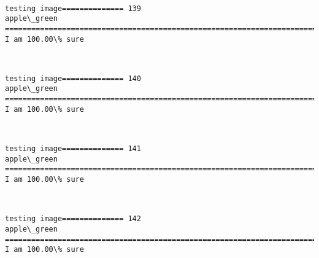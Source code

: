 \documentclass[11pt]{article}
\begin{document}
    \begin{center}
    \end{center}
    { \hspace*{\fill} \\}
    
    \begin{Verbatim}[commandchars=\\\{\}]
testing image============== 139
apple\_green
============================================================================
I am 100.00\% sure

    \end{Verbatim}

    \begin{center}
    \end{center}
    { \hspace*{\fill} \\}
    
    \begin{Verbatim}[commandchars=\\\{\}]
testing image============== 140
apple\_green
============================================================================
I am 100.00\% sure

    \end{Verbatim}

    \begin{center}
    \end{center}
    { \hspace*{\fill} \\}
    
    \begin{Verbatim}[commandchars=\\\{\}]
testing image============== 141
apple\_green
============================================================================
I am 100.00\% sure

    \end{Verbatim}

    \begin{center}
    \end{center}
    { \hspace*{\fill} \\}
    
    \begin{Verbatim}[commandchars=\\\{\}]
testing image============== 142
apple\_green
============================================================================
I am 100.00\% sure

    \end{Verbatim}
\end{document}
